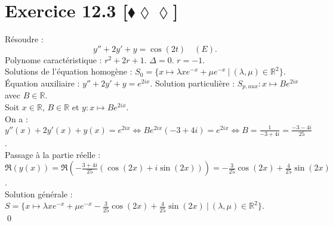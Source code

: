 \documentclass[10pt]{article}
\begin{document}
\section*{Exercice 12.3 [$\blacklozenge\lozenge\lozenge$]}
\begin{tcolorbox}[enhanced, width=7.5in, center, size=fbox, fontupper=\large, drop shadow southwest]
    Résoudre :
    \begin{equation*}
        y'' + 2y' + y = \cos(2t) \quad (E).
    \end{equation*}
    Polynome caractéristique : $r^2 + 2r + 1$. $\Delta = 0$. $r = -1$.\\
    Solutions de l'équation homogène : $S_0 = \{x \mapsto \lambda x e^{-x} + \mu e ^{-x} ~ | ~ (\lambda, \mu) \in \mathbb{R}^2\}$.\\
    Équation auxiliaire : $y'' + 2y' + y = e^{2ix}$. Solution particulière : $S_{p,aux} : x\mapsto Be^{2ix}$ avec $B\in\mathbb{R}$.\\
    Soit $x\in\mathbb{R}$, $B\in\mathbb{R}$ et $y:x\mapsto Be^{2ix}$.\\
    On a : $y''(x) + 2y'(x) + y(x) = e^{2ix} \iff Be^{2ix}(-3+4i)= e^{2ix} \iff B = \frac{1}{-3+4i} = \frac{-3-4i}{25}$.\\
    Passage à la partie réelle : $\Re(y(x)) = \Re\left( -\frac{3+4i}{25}\left( \cos(2x) + i\sin(2x) \right) \right) = -\frac{3}{25}\cos(2x) + \frac{4}{25}\sin(2x)$.\\
    Solution générale : $S = \{x \mapsto \lambda x e^{-x} + \mu e^{-x} - \frac{3}{25}\cos(2x) + \frac{4}{25}\sin(2x) ~ | ~ (\lambda, \mu) \in \mathbb{R}^2\}$.\\
    \qed
\end{tcolorbox}
\end{document}
